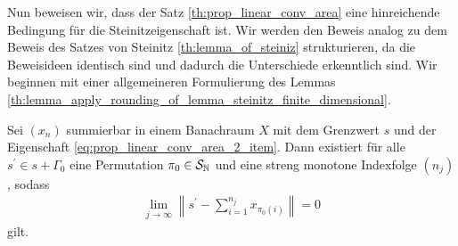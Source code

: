 Nun beweisen wir, dass der Satz \ref{th:prop_linear_conv_area} eine hinreichende Bedingung für die Steinitzeigenschaft ist.
Wir werden den Beweis analog zu dem Beweis des Satzes von Steinitz \ref{th:lemma_of_steiniz} strukturieren, da die Beweisideen identisch sind und dadurch die Unterschiede erkenntlich sind.
Wir beginnen mit einer allgemeineren Formulierung des Lemmas \ref{th:lemma_apply_rounding_of_lemma_steinitz_finite_dimensional}.

\begin{lem}\label{th:using_rounding_lemma_suff_cond}
	Sei $ (x_n) $ summierbar in einem Banachraum $ X $ mit dem Grenzwert $ s $ und der Eigenschaft \ref{eq:prop_linear_conv_area_2_item}.
	Dann existiert für alle $ s^\prime  \in s + \Gamma_0 $ eine Permutation $ \pi_0 \in \mathcal{S}_{\mathbb{N}}$  und eine streng monotone Indexfolge $ (n_j) $, sodass
	\begin{align*}
		\lim \limits_{j \to \infty}
		\left\| s^\prime - \sum \limits_{i = 1}^{n_j} x_{\pi_0(i)} 
		\right\| = 0
	\end{align*}
	gilt.
\end{lem}

